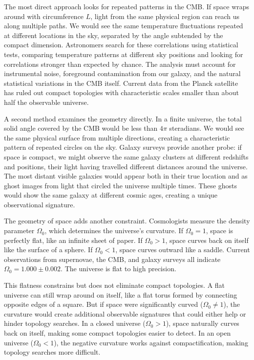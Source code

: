The most direct approach looks for repeated patterns in the CMB. If space wraps around with circumference $L$, light from the same physical region can reach us along multiple paths. We would see the same temperature fluctuations repeated at different locations in the sky, separated by the angle subtended by the compact dimension. Astronomers search for these correlations using statistical tests, comparing temperature patterns at different sky positions and looking for correlations stronger than expected by chance. The analysis must account for instrumental noise, foreground contamination from our galaxy, and the natural statistical variations in the CMB itself. Current data from the Planck satellite has ruled out compact topologies with characteristic scales smaller than about half the observable universe.

A second method examines the geometry directly. In a finite universe, the total solid angle covered by the CMB would be less than $4\pi$ steradians. We would see the same physical surface from multiple directions, creating a characteristic pattern of repeated circles on the sky. Galaxy surveys provide another probe: if space is compact, we might observe the same galaxy clusters at different redshifts and positions, their light having travelled different distances around the universe. The most distant visible galaxies would appear both in their \QSOpen{}true\QSClose{} location and as \QSOpen{}ghost images\QSClose{} from light that circled the universe multiple times. These ghosts would show the same galaxy at different cosmic ages, creating a unique observational signature.

The geometry of space adds another constraint. Cosmologists measure the density parameter $\Omega_0$, which determines the universe's curvature. If $\Omega_0 = 1$, space is perfectly flat, like an infinite sheet of paper. If $\Omega_0 > 1$, space curves back on itself like the surface of a sphere. If $\Omega_0 < 1$, space curves outward like a saddle. Current observations from supernovae, the CMB, and galaxy surveys all indicate $\Omega_0 = 1.000 \pm 0.002$. The universe is flat to high precision.

This flatness constrains but does not eliminate compact topologies. A flat universe can still wrap around on itself, like a flat torus formed by connecting opposite edges of a square. But if space were significantly curved ($\Omega_0 \neq 1$), the curvature would create additional observable signatures that could either help or hinder topology searches. In a closed universe ($\Omega_0 > 1$), space naturally curves back on itself, making some compact topologies easier to detect. In an open universe ($\Omega_0 < 1$), the negative curvature works against compactification, making topology searches more difficult.

